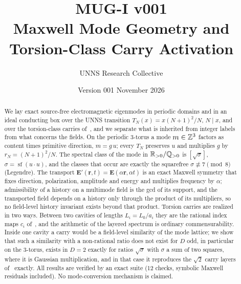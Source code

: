 \documentclass[11pt,a4paper]{article}
\title{\bfseries MUG-I v001\\[2pt] Maxwell Mode Geometry and Torsion-Class Carry Activation}
\author{UNNS Research Collective}
\date{Version 001 \quad November 2026}
\theoremstyle{definition}
\theoremstyle{remark}
\newcommand{\bE}{\mathbf E}\newcommand{\bB}{\mathbf B}
\DeclareMathOperator{\sqf}{sf}
\begin{document}
\maketitle

\begin{abstract}
\noindent
We lay exact source-free electromagnetic eigenmodes in periodic domains and in an ideal conducting box over the UNNS transition $T_N(x)=x(N+1)^2/N$, $N\mid x$, and over the torsion-class carries of~\cite{TC}, and we separate what is inherited from integer labels from what concerns the fields. On the periodic $3$-torus a mode $m\in\mathbb Z^3$ factors as content times primitive direction, $m=g\,u$; every $T_N$ preserves $u$ and multiplies $g$ by $r_N=(N+1)^2/N$. The spectral class of the mode in $\mathbb R_{>0}/\mathbb Q_{>0}$ is $[\sqrt\sigma]$, $\sigma=\sqf(u\cdot u)$, and the classes that occur are exactly the squarefree $\sigma\not\equiv7\pmod 8$ (Legendre). The transport $\bE'(\mathbf r,t)=\bE(\alpha\mathbf r,\alpha t)$ is an exact Maxwell symmetry that fixes direction, polarization, amplitude and energy and multiplies frequency by $\alpha$; admissibility of a history on a multimode field is the gcd of its support, and the transported field depends on a history only through the product of its multipliers, so no field-level history invariant exists beyond that product. Torsion carries are realized in two ways. Between two cavities of lengths $L_i=L_0/a_i$ they are the rational index maps $c_i$ of~\cite{TC}, and the arithmetic of the layered spectrum is ordinary commensurability. Inside one cavity a carry would be a field-level similarity of the mode lattice; we show that such a similarity with a non-rational ratio does not exist for $D$ odd, in particular on the $3$-torus, exists in $D=2$ exactly for ratios $\sqrt\sigma$ with $\sigma$ a sum of two squares, where it is Gaussian multiplication, and in that case it reproduces the $\sqrt2$ carry layers of~\cite{TC} exactly. All results are verified by an exact suite (12 checks, symbolic Maxwell residuals included). No mode-conversion mechanism is claimed.
\end{abstract}

\end{document}
